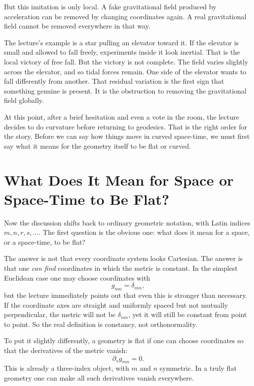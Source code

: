 But this imitation is only local. A fake gravitational field produced by acceleration can be removed by changing coordinates again. A real gravitational field cannot be removed everywhere in that way.

The lecture's example is a star pulling an elevator toward it. If the elevator is small and allowed to fall freely, experiments inside it look inertial. That is the local victory of free fall. But the victory is not complete. The field varies slightly across the elevator, and so tidal forces remain. One side of the elevator wants to fall differently from another. That residual variation is the first sign that something genuine is present. It is the obstruction to removing the gravitational field globally.

At this point, after a brief hesitation and even a vote in the room, the lecture decides to do curvature before returning to geodesics. That is the right order for the story. Before we can say how things move in curved space-time, we must first say what it means for the geometry itself to be flat or curved.

\section{What Does It Mean for Space or Space-Time to Be Flat?}

Now the discussion shifts back to ordinary geometric notation, with Latin indices \(m,n,r,s,\ldots\). The first question is the obvious one: what does it mean for a space, or a space-time, to be flat?

The answer is not that every coordinate system looks Cartesian. The answer is that one \emph{can find} coordinates in which the metric is constant. In the simplest Euclidean case one may choose coordinates with
\[
g_{mn}=\delta_{mn},
\]
but the lecture immediately points out that even this is stronger than necessary. If the coordinate axes are straight and uniformly spaced but not mutually perpendicular, the metric will not be \(\delta_{mn}\), yet it will still be constant from point to point. So the real definition is constancy, not orthonormality.

To put it slightly differently, a geometry is flat if one can choose coordinates so that the derivatives of the metric vanish:
\begin{equation}
\partial_{s}g_{mn}=0.
\end{equation}
This is already a three-index object, with \(m\) and \(n\) symmetric. In a truly flat geometry one can make all such derivatives vanish everywhere.

